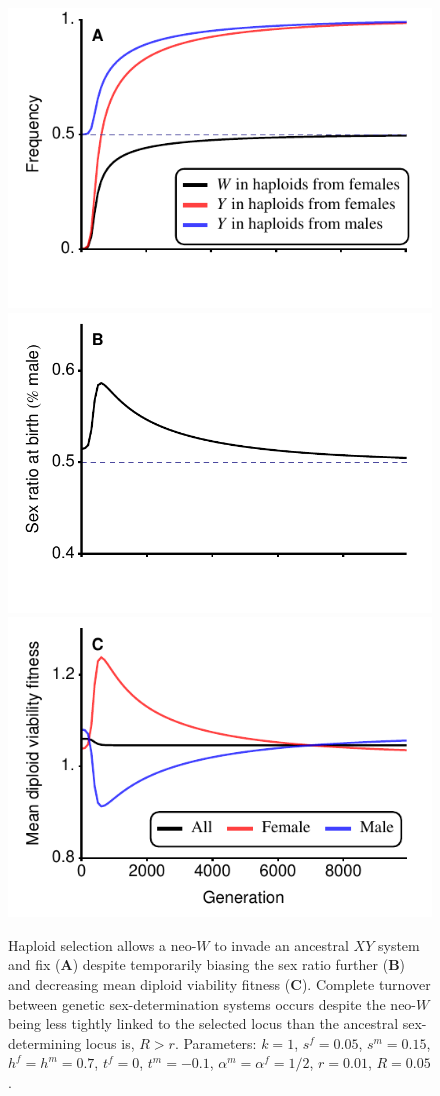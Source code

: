 \documentclass[12pt]{article}
\begin{document}
\begin{figure}
\centering
\includegraphics[width=0.5\linewidth]{FreqWLowR}\\
\includegraphics[width=0.5\linewidth]{SexRatioLowR}\\
\includegraphics[width=0.5\linewidth]{MeanDipFitLowR}
\caption{
Haploid selection allows a neo-$W$ to invade an ancestral $XY$ system and fix (\textbf{A}) despite temporarily biasing the sex ratio further (\textbf{B}) and decreasing mean diploid viability fitness (\textbf{C}).
Complete turnover between genetic sex-determination systems occurs despite the neo-$W$ being less tightly linked to the selected locus than the ancestral sex-determining locus is, $R>r$.
Parameters: $k=1$, $s^f = 0.05$, $s^m = 0.15$, $h^f = h^m = 0.7$, $t^f = 0$, $t^m = -0.1$, $\alpha^m = \alpha^f = 1/2$, $r=0.01$, $R=0.05$.
}
\label{fig:WinvasionLowR}
\end{figure}
\end{document}
